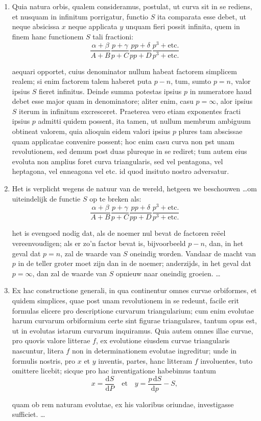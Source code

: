 \documentclass[10pt,a4paper]{article}
\newcommand{\switchenum}{\setcounter{enumi}{\arabic{enumi}-1}\switchcolumn}
\def\D{\mathrm{d}}
\begin{document}
\begin{paracol}{2}
\begin{enumerate}[topsep=1px]
		\item Quia natura orbis, qualem consideramus, postulat, ut curva sit in se rediens, et nusquam in infinitum porrigatur, functio $S$ ita comparata esse debet, ut neque absicissa $x$ neque applicata $y$ unquam fieri possit infinita, quem in finem hanc functionem $S$ tali fractioni:
		\[
			\frac{\alpha+\beta}{A+B}\frac{p+\gamma }{p+C} \frac{p p+\delta}{p p+D} \frac{p^3+\text{etc}.}{p^3+\text{etc}.}
		\]
		\par aequari opportet, cuius denominator nullum habeat factorem simplicem realem; si enim factorem talem haberet puta $p-n$, tum, sumto $p=n$, valor ipsius $S$ fieret infinitus. Deinde summa potestas ipsius $p$ in numeratore haud debet esse major quam in denominatore; aliter enim, casu $p=\infty$, alor ipsius $S$ iterum in infinitum excresceret. Praeterea vero etiam exponentes fracti ipsius $p$ admitti quidem possent, ita tamen, ut nullum membrum ambiguum obtineat valorem, quia alioquin eidem valori ipsius $p$ plures tam abscissae quam applicatae convenire possent; hoc enim casu curva non pst unam revolutionem, sed demum post duas plureque in se rediret; tum autem eius evoluta non amplius foret curva triangularis, sed vel pentagona, vel heptagona, vel enneagona vel etc. id quod insituto nostro adversatur.
		
		\switchenum
		\item Het is verplicht wegens de natuur van de wereld, hetgeen we beschouwen \ldots om uiteindelijk de functie $S$ op te breken als:
		\[
			\frac{\alpha+\beta}{A+B}\frac{p+\gamma }{p+C} \frac{p p+\delta}{p p+D} \frac{p^3+\text{etc}.}{p^3+\text{etc}.}
		\]
		\par het is evengoed nodig dat, als de noemer nul bevat de factoren reëel vereenvoudigen; als er zo'n factor bevat is, bijvoorbeeld $p-n$, dan, in het geval dat $p=n$, zal de waarde van $S$ oneindig worden. Vandaar de macht van $p$ in de teller groter moet zijn dan in de noemer; anderzijds, in het geval dat $p=\infty$, dan zal de waarde van $S$ opnieuw naar oneindig groeien. \ldots
		

		\switchcolumn*
		
		\item Ex hac constructione generali, in qua continentur omnes curvae orbiformes, et quidem simplices, quae post unam revolutionem in se redeunt, facile erit formulas elicere pro descriptione curvarum triangularium; cum enim evolutae harum curvarum orbiformium certe sint figurae triangulares, tantum opus est, ut in evolutas istarum curvarum inquiramus. Quia autem omnes illae curvae, pro quovis valore litterae $f$, ex evolutione eiusdem curvae triangularis nascuntur, litera $f$ non in determinationem evolutae ingreditur; unde in formulis nostris, pro $x$ et $y$ inventis, partes, hanc litteram $f$ involuentes, tuto omittere licebit; sicque pro hac inventigatione habebimus tantum
		\[
			x = \frac{\D S}{\D P} \quad\text{et} \quad y = \frac{p\,\D S}{\D p}-S,
		\]
		\par quam ob rem naturam evolutae, ex his valoribus oriundae, investigasse sufficiet. \ldots
		

\end{enumerate}
\end{paracol}
\end{document}
